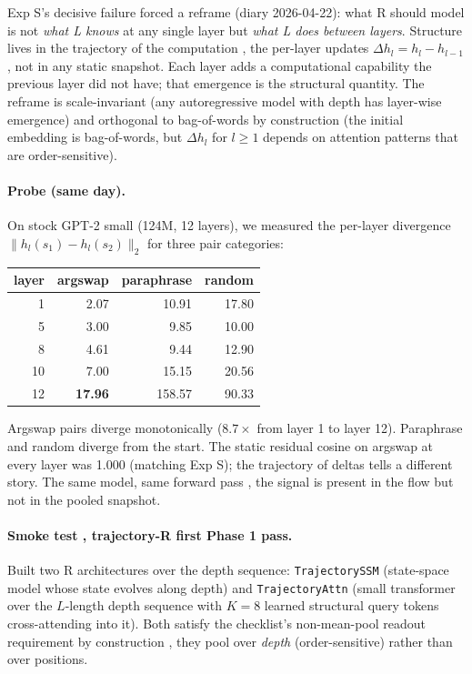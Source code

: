 \documentclass[10pt, twocolumn, a4paper]{article}
\begin{document}
Exp S's decisive failure forced a reframe (diary 2026-04-22): what R should model is not \emph{what L knows} at any single layer but \emph{what L does between layers}. Structure lives in the trajectory of the computation ,  the per-layer updates $\Delta h_l = h_l - h_{l-1}$ ,  not in any static snapshot. Each layer adds a computational capability the previous layer did not have; that emergence is the structural quantity. The reframe is scale-invariant (any autoregressive model with depth has layer-wise emergence) and orthogonal to bag-of-words by construction (the initial embedding is bag-of-words, but $\Delta h_l$ for $l \geq 1$ depends on attention patterns that are order-sensitive).

\paragraph{Probe (same day).} On stock GPT-2 small (124M, 12 layers), we measured the per-layer divergence $\|h_l(s_1) - h_l(s_2)\|_2$ for three pair categories:

\begin{center}\small
\begin{tabular}{r|r|r|r}
\toprule
layer & argswap & paraphrase & random \\
\midrule
1  & 2.07 & 10.91 & 17.80 \\
5  & 3.00 &  9.85 & 10.00 \\
8  & 4.61 &  9.44 & 12.90 \\
10 & 7.00 & 15.15 & 20.56 \\
12 & \textbf{17.96} & 158.57 & 90.33 \\
\bottomrule
\end{tabular}
\end{center}

Argswap pairs diverge monotonically ($8.7\times$ from layer 1 to layer 12). Paraphrase and random diverge from the start. The static residual cosine on argswap at every layer was 1.000 (matching Exp S); the trajectory of deltas tells a different story. The same model, same forward pass ,  the signal is present in the flow but not in the pooled snapshot.

\paragraph{Smoke test ,  trajectory-R first Phase 1 pass.} Built two R architectures over the depth sequence: \texttt{TrajectorySSM} (state-space model whose state evolves along depth) and \texttt{TrajectoryAttn} (small transformer over the $L$-length depth sequence with $K=8$ learned structural query tokens cross-attending into it). Both satisfy the checklist's non-mean-pool readout requirement by construction ,  they pool over \emph{depth} (order-sensitive) rather than over positions.
\end{document}
